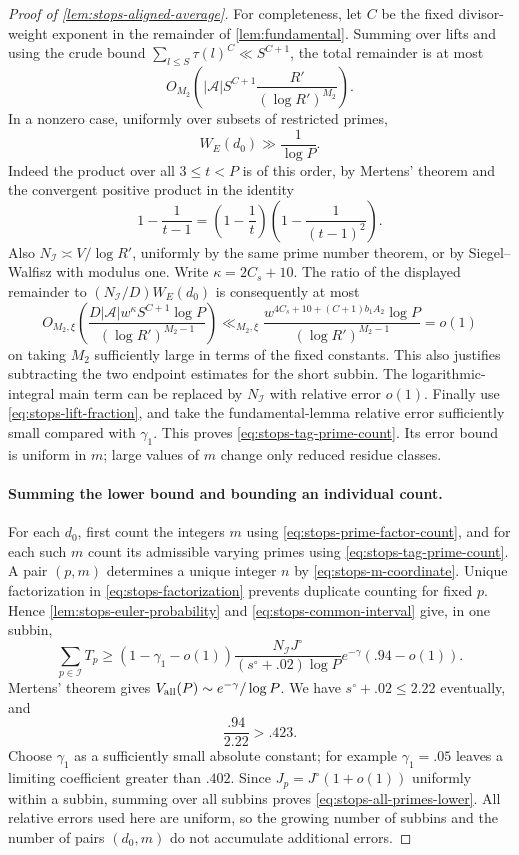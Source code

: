 \begin{proof}[Proof of \cref{lem:stops-aligned-average}]
For completeness, let $C$ be the fixed divisor-weight exponent in the
remainder of \cref{lem:fundamental}.  Summing over lifts and using the
crude bound $\sum_{l\le S}\tau(l)^C\ll S^{C+1}$, the total remainder
is at most
\[
 O_{M_2}\left(
 |\mathcal A|S^{C+1}\frac{R'}{(\log R')^{M_2}}
 \right).
\]
In a nonzero case, uniformly over subsets of restricted primes,
\[
 W_E(d_0)\gg\frac1{\log P}.
\]
Indeed the product over all $3\le t<P$ is of this order, by Mertens'
theorem and the convergent positive product in the identity
\[
 1-\frac1{t-1}
 =\left(1-\frac1t\right)
   \left(1-\frac1{(t-1)^2}\right).
\]
Also $N_{\mathcal I}\asymp V/\log R'$, uniformly by the same
prime number theorem, or by Siegel--Walfisz with modulus one.  Write
$\kappa=2C_s+10$.  The ratio of the displayed remainder to
$(N_{\mathcal I}/D)W_E(d_0)$ is consequently at most
\[
 O_{M_2,\xi}\left(
 \frac{D|\mathcal A|w^\kappa S^{C+1}\log P}
      {(\log R')^{M_2-1}}
 \right)
 \ll_{M_2,\xi}
 \frac{w^{4C_s+10+(C+1)b_1A_2}\log P}
      {(\log R')^{M_2-1}}=o(1)
\]
on taking $M_2$ sufficiently large in terms of the fixed constants.
This also justifies subtracting the two endpoint estimates for the
short subbin.  The logarithmic-integral main term can be replaced by
$N_{\mathcal I}$ with relative error $o(1)$.  Finally use
\eqref{eq:stops-lift-fraction}, and take the fundamental-lemma relative
error sufficiently small compared with $\gamma_1$.  This proves
\eqref{eq:stops-tag-prime-count}.  Its error bound is uniform in $m$;
large values of $m$ change only reduced residue classes.

\paragraph{Summing the lower bound and bounding an individual count.}
For each $d_0$, first count the integers $m$ using
\eqref{eq:stops-prime-factor-count}, and for each such $m$ count its
admissible varying primes using \eqref{eq:stops-tag-prime-count}.  A pair
$(p,m)$ determines a unique integer $n$ by
\eqref{eq:stops-m-coordinate}.  Unique factorization in
\eqref{eq:stops-factorization} prevents duplicate counting for fixed
$p$.  Hence \cref{lem:stops-euler-probability} and
\eqref{eq:stops-common-interval} give, in one subbin,
\[
 \sum_{p\in\mathcal I}T_p
 \ge (1-\gamma_1-o(1))
       \frac{N_{\mathcal I}J^\circ}{(s^\circ+.02)\log P}
       e^{-\gamma}(.94-o(1)).
\]
Mertens' theorem gives
$V_{\rm all}(P)\sim e^{-\gamma}/\log P$.  We have
$s^\circ+.02\le2.22$ eventually, and
\[
 \frac{.94}{2.22}>.423.
\]
Choose $\gamma_1$ as a sufficiently small absolute constant; for
example $\gamma_1=.05$ leaves a limiting coefficient greater than
$.402$.  Since $J_p=J^\circ(1+o(1))$ uniformly within a subbin,
summing over all subbins proves \eqref{eq:stops-all-primes-lower}.
All relative errors used here are uniform, so the growing number of
subbins and the number of pairs $(d_0,m)$ do not accumulate additional
errors.


\end{proof}
